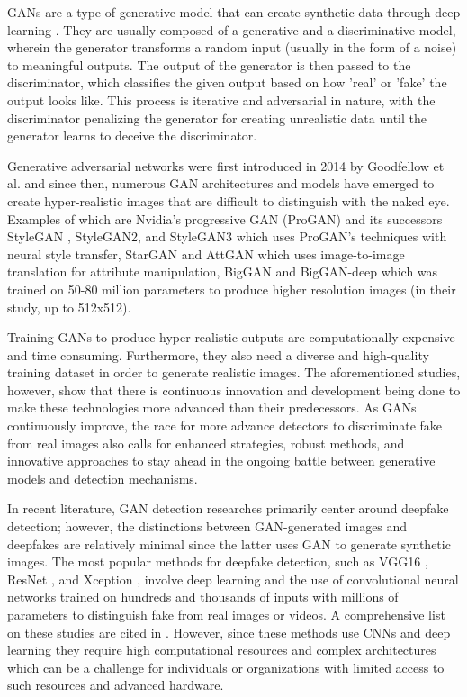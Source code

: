 \documentclass[journal]{./IEEE/IEEEtran}
\begin{document}
\par GANs are a type of generative model that can create synthetic data through deep learning \cite{google-ML}. They are usually composed of a generative and a discriminative model, wherein the generator transforms a random input (usually in the form of a noise) to meaningful outputs. The output of the generator is then passed to the discriminator, which classifies the given output based on how 'real' or 'fake' the output looks like. This process is iterative and adversarial in nature, with the discriminator penalizing the generator for creating unrealistic data until the generator learns to deceive the discriminator. 
\pubidadjcol
\par Generative adversarial networks were first introduced in 2014 by Goodfellow et al. \cite{GAN-2014} and since then, numerous GAN architectures and models have emerged to create hyper-realistic images that are difficult to distinguish with the naked eye. Examples of which are Nvidia's progressive GAN (ProGAN) \cite{ProGAN} and its successors StyleGAN \cite{StyleGAN-2018}, StyleGAN2, and StyleGAN3 which uses ProGAN's techniques with neural style transfer, StarGAN \cite{StarGAN-2018} and AttGAN \cite{AttGAN} which uses image-to-image translation for attribute manipulation, BigGAN and BigGAN-deep \cite{BigGAN} which was trained on 50-80 million parameters to produce higher resolution images (in their study, up to 512x512). 

\par Training GANs to produce hyper-realistic outputs are computationally expensive and time consuming. Furthermore, they also need a diverse and high-quality training dataset in order to generate realistic images. The aforementioned studies, however, show that there is continuous innovation and development being done to make these technologies more advanced than their predecessors. As GANs continuously improve, the race for more advance detectors to discriminate fake from real images also calls for enhanced strategies, robust methods, and innovative approaches to stay ahead in the ongoing battle between generative models and detection mechanisms. 

\par In recent literature, GAN detection researches primarily center around deepfake detection; however, the distinctions between GAN-generated images and deepfakes are relatively minimal since the latter uses GAN to generate synthetic images. The most popular methods for deepfake detection, such as VGG16 \cite{vgg16}, ResNet \cite{resnet}, and Xception \cite{xception}, involve deep learning and the use of convolutional neural networks trained on hundreds and thousands of inputs with millions of parameters to distinguish fake from real images or videos. A comprehensive list on these studies are cited in \cite{deeplearning-litrev, deeplearning-litrev2, deeplearning-litrev3}. However, since these methods use CNNs and deep learning they require high computational resources and complex architectures which can be a challenge for individuals or organizations with limited access to such resources and advanced hardware. 
\end{document}
